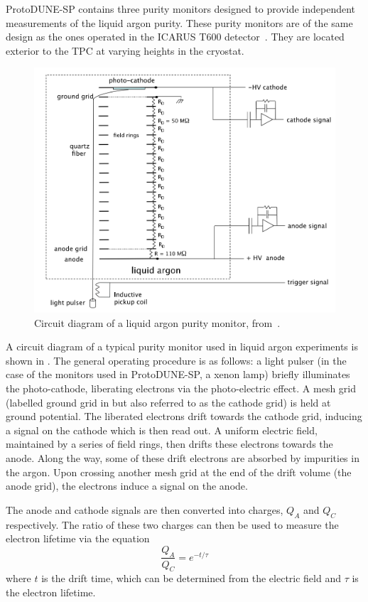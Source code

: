 ProtoDUNE-SP contains three purity monitors designed to provide independent measurements of the liquid argon purity.
These purity monitors are of the same design as the ones operated in the ICARUS T600 detector~\cite{icarus}.
They are located exterior to the TPC at varying heights in the cryostat.

\begin{figure}[h]
	\centering
	\includegraphics[width=.6\linewidth]{files/figures/protodune_detector/prmDiag}
	\caption[Circuit diagram of a typical purity monitor used in a liquid argon experiment]{Circuit diagram of a liquid argon purity monitor, from~\cite{Adamowski_2014}.}
	\label{fig:prmDiag}
\end{figure} 

A circuit diagram of a typical purity monitor used in liquid argon experiments is shown in .
The general operating procedure is as follows: a light pulser (in the case of the monitors used in ProtoDUNE-SP, a xenon lamp) briefly illuminates the photo-cathode, liberating electrons via the photo-electric effect.
A mesh grid (labelled ground grid in  but also referred to as the cathode grid) is held at ground potential.
The liberated electrons drift towards the cathode grid, inducing a signal on the cathode which is then read out.
A uniform electric field, maintained by a series of field rings, then drifts these electrons towards the anode.
Along the way, some of these drift electrons are absorbed by impurities in the argon.
Upon crossing another mesh grid at the end of the drift volume (the anode grid), the electrons induce a signal on the anode.

The anode and cathode signals are then converted into charges, $Q_{A}$ and $Q_{C}$ respectively.
The ratio of these two charges can then be used to measure the electron lifetime via the equation
\begin{equation}
\frac{Q_{A}}{Q_{C}} = e^{-t/\tau}
\end{equation}
where $t$ is the drift time, which can be determined from the electric field and $\tau$ is the electron lifetime.

